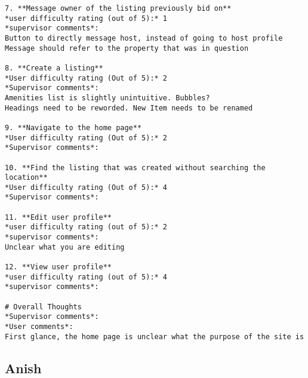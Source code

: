 \begin{lstlisting}
7. **Message owner of the listing previously bid on**
*user difficulty rating (out of 5):* 1
*supervisor comments*:
Button to directly message host, instead of going to host profile
Message should refer to the property that was in question

8. **Create a listing**
*User difficulty rating (Out of 5):* 2
*Supervisor comments*:
Amenities list is slightly unintuitive. Bubbles?
Headings need to be reworded. New Item needs to be renamed

9. **Navigate to the home page**
*User difficulty rating (Out of 5):* 2
*Supervisor comments*:

10. **Find the listing that was created without searching the location**
*User difficulty rating (Out of 5):* 4
*Supervisor comments*:

11. **Edit user profile**
*user difficulty rating (out of 5):* 2
*supervisor comments*:
Unclear what you are editing

12. **View user profile**
*user difficulty rating (out of 5):* 4
*supervisor comments*:

# Overall Thoughts
*Supervisor comments*:
*User comments*:
First glance, the home page is unclear what the purpose of the site is

\end{lstlisting}

\subsection{Anish}

